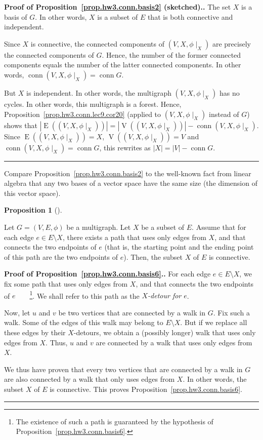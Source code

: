 \documentclass[numbers=enddot,12pt,final,onecolumn,notitlepage]{scrartcl}%
\theoremstyle{definition}
\newtheorem{prop}[theo]{Proposition}
\newenvironment{proposition}[1][]
{\begin{prop}[#1]\begin{leftbar}}
{\end{leftbar}\end{prop}}
\newenvironment{proof}[1][Proof]{\noindent\textbf{#1.} }{\ \rule{0.5em}{0.5em}}
\newcommand{\conn}{\operatorname{conn}}
\newcommand{\abs}[1]{\left| #1 \right|}
\newcommand{\tup}[1]{\left( #1 \right)}
\newcommand{\verts}[1]{\operatorname{V}\left( #1 \right)}
\newcommand{\edges}[1]{\operatorname{E}\left( #1 \right)}
\begin{document}
\begin{proof}[Proof of Proposition~\ref{prop.hw3.conn.basis2}
(sketched).]
The set $X$ is a basis of $G$.
In other words, $X$ is a subset of $E$ that is both connective
and independent.

Since $X$ is connective, the connected components of
$\tup{V, X, \phi\mid_X}$ are precisely the connected components
of $G$.
Hence, the number of the former connected components equals the
number of the latter connected components.
In other words, $\conn \tup{V, X, \phi\mid_X} = \conn G$.

But $X$ is independent.
In other words, the multigraph $\tup{V, X, \phi\mid_X}$ has no
cycles.
In other words, this multigraph is a forest.
Hence, Proposition~\ref{prop.hw3.conn.lec9.cor20}
(applied to $\tup{V, X, \phi\mid_X}$ instead of $G$) shows that
$\abs{\edges{\tup{V, X, \phi\mid_X}}}
= \abs{\verts{\tup{V, X, \phi\mid_X}}}
   - \conn \tup{V, X, \phi\mid_X}$.
Since $\edges{\tup{V, X, \phi\mid_X}} = X$,
$\verts{\tup{V, X, \phi\mid_X}} = V$ and
$\conn \tup{V, X, \phi\mid_X} = \conn G$, this rewrites as
$\abs{X} = \abs{V} - \conn G$.
\end{proof}

Compare Proposition~\ref{prop.hw3.conn.basis2} to the well-known
fact from linear algebra that any two bases of a vector space
have the same size (the dimension of this vector space).

\begin{proposition} \label{prop.hw3.conn.basis6}
Let $G = \tup{V, E, \phi}$ be a multigraph.
Let $X$ be a subset of $E$.
Assume that for each edge $e \in E \setminus X$,
there exists a path that uses only edges from $X$,
and that connects the two endpoints of $e$
(that is, the starting point and the ending point of
this path are the two endpoints of $e$).
Then, the subset $X$ of $E$ is connective.
\end{proposition}

\begin{proof}[Proof of Proposition~\ref{prop.hw3.conn.basis6}.]
For each edge $e \in E \setminus X$, we fix some path
that uses only edges from $X$, and that connects the
two endpoints of $e$\ \ \ \ \footnote{The existence of
such a path is guaranteed by the hypothesis of
Proposition~\ref{prop.hw3.conn.basis6}.}.
We shall refer to this path as the
\textit{$X$-detour for $e$}.

Now, let $u$ and $v$ be two vertices that are connected
by a walk in $G$.
Fix such a walk.
Some of the edges of this walk may belong to
$E \setminus X$.
But if we replace all these edges by their $X$-detours,
we obtain a (possibly longer) walk that uses only edges
from $X$.
Thus, $u$ and $v$ are connected by a walk that uses
only edges from $X$.

We thus have proven that every
two vertices that are connected by a walk in $G$ are
also connected by a walk that only uses edges from $X$.
In other words, the subset $X$ of $E$ is connective.
This proves Proposition~\ref{prop.hw3.conn.basis6}.
\end{proof}
\end{document}
